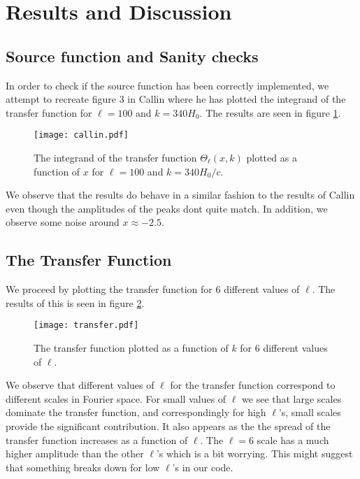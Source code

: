 \documentclass[a4paper, 10pt, reqno]{amsart}
\begin{document}
\section{Results and Discussion}

\subsection{Source function and Sanity checks}
In order to check if the source function has been correctly implemented, we attempt to recreate figure 3 in Callin where he has plotted the integrand of the transfer function for $\ell = 100$ and $k = 340H_0$. The results are seen in figure \ref{fig: callin}.

\begin{figure}
    \centering
    \texttt{[image: callin.pdf]}
    \caption{The integrand of the transfer function $\Theta_\ell(x,k)$ plotted as a function of $x$ for $\ell = 100$ and $k = 340H_0/c$.}
    \label{fig: callin}
\end{figure}
We observe that the results do behave in a similar fashion to the results of Callin even though the amplitudes of the peaks dont quite match. In addition, we observe some noise around $x \approx -2.5$. 

\subsection{The Transfer Function}
We proceed by plotting the transfer function for 6 different values of $\ell$. The results of this is seen in figure \ref{fig: transfer}.
\begin{figure}
    \centering
    \texttt{[image: transfer.pdf]}
    \caption{The transfer function plotted as a function of $k$ for 6 different values of $\ell$.}
    \label{fig: transfer}
\end{figure}
We observe that different values of $\ell$ for the transfer function correspond to different scales in Fourier space. For small values of $\ell$ we see that large scales dominate the transfer function, and correspondingly for high $\ell$'s, small scales provide the significant contribution. It also appears as the the spread of the transfer function increases as a function of $\ell$. The $\ell = 6$ scale has a much higher amplitude than the other $\ell$'s which is a bit worrying. This might suggest that something breaks down for low $\ell$'s in our code.
\end{document}

